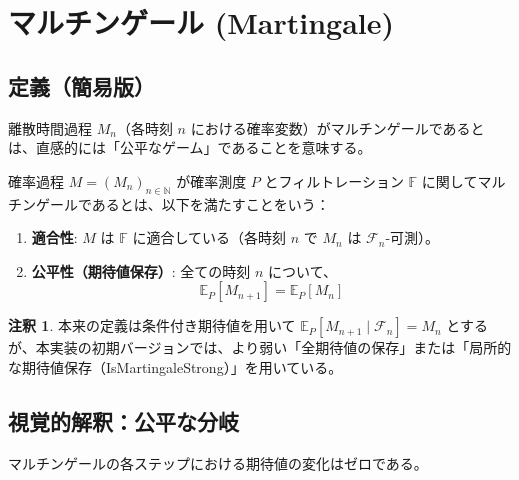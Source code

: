 \documentclass[a4paper,11pt]{article}
\theoremstyle{definition}
\newtheorem{remark}{注釈}[section]
\newcommand{\Filtration}{\mathbb{F}}
\newcommand{\Nat}{\mathbb{N}}
\newcommand{\ExP}[2]{\mathbb{E}_{#1}[#2]}
\begin{document}
\section{マルチンゲール (Martingale)}

\subsection{定義（簡易版）}
離散時間過程 $M_n$（各時刻 $n$ における確率変数）がマルチンゲールであるとは、直感的には「公平なゲーム」であることを意味する。

\begin{tcolorbox}[colback=green!5!white, colframe=green!75!black, title=定義 2: マルチンゲール（簡易版）]
確率過程 $M = (M_n)_{n \in \Nat}$ が確率測度 $P$ とフィルトレーション $\Filtration$ に関してマルチンゲールであるとは、以下を満たすことをいう：
\begin{enumerate}
    \item \textbf{適合性}: $M$ は $\Filtration$ に適合している（各時刻 $n$ で $M_n$ は $\mathcal{F}_n$-可測）。
    \item \textbf{公平性（期待値保存）}: 全ての時刻 $n$ について、
    \[ \ExP{P}{M_{n+1}} = \ExP{P}{M_n} \]
\end{enumerate}
\end{tcolorbox}
\begin{remark}
本来の定義は条件付き期待値を用いて $\ExP{P}{M_{n+1} \mid \mathcal{F}_n} = M_n$ とするが、本実装の初期バージョンでは、より弱い「全期待値の保存」または「局所的な期待値保存（IsMartingaleStrong）」を用いている。
\end{remark}

\subsection{視覚的解釈：公平な分岐}
マルチンゲールの各ステップにおける期待値の変化はゼロである。
\end{document}
